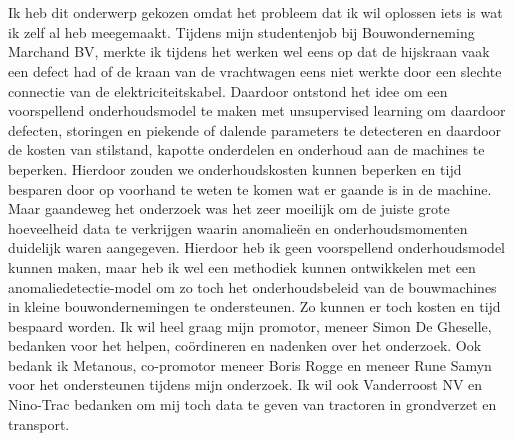 
\chapter*{}%
\label{ch:voorwoord}


Ik heb dit onderwerp gekozen omdat het probleem dat ik wil oplossen iets is wat ik zelf al heb meegemaakt. Tijdens mijn studentenjob bij Bouwonderneming Marchand BV, merkte ik tijdens het werken wel eens op dat de hijskraan vaak een defect had of de kraan van de vrachtwagen eens niet werkte door een slechte connectie van de elektriciteitskabel. 
Daardoor ontstond het idee om een voorspellend onderhoudsmodel te maken met unsupervised learning om daardoor defecten, storingen en piekende of dalende parameters te detecteren en daardoor de kosten van stilstand, kapotte onderdelen en onderhoud aan de machines te beperken. Hierdoor zouden we onderhoudskosten kunnen beperken en tijd besparen door op voorhand te weten te komen wat er gaande is in de machine. Maar gaandeweg het onderzoek was het zeer moeilijk om de juiste grote hoeveelheid data te verkrijgen waarin anomalieën en onderhoudsmomenten duidelijk waren aangegeven. Hierdoor heb ik geen voorspellend onderhoudsmodel kunnen maken, maar heb ik wel een methodiek kunnen ontwikkelen met een anomaliedetectie-model om zo toch het onderhoudsbeleid van de bouwmachines in kleine bouwondernemingen te ondersteunen. Zo kunnen er toch kosten en tijd bespaard worden. Ik wil heel graag mijn promotor, meneer Simon De Gheselle, bedanken voor het helpen, coördineren en nadenken over het onderzoek. Ook bedank ik Metanous, co-promotor meneer Boris Rogge en meneer Rune Samyn voor het ondersteunen tijdens mijn onderzoek. Ik wil ook Vanderroost NV en Nino-Trac bedanken om mij toch data te geven van tractoren in grondverzet en transport. 
